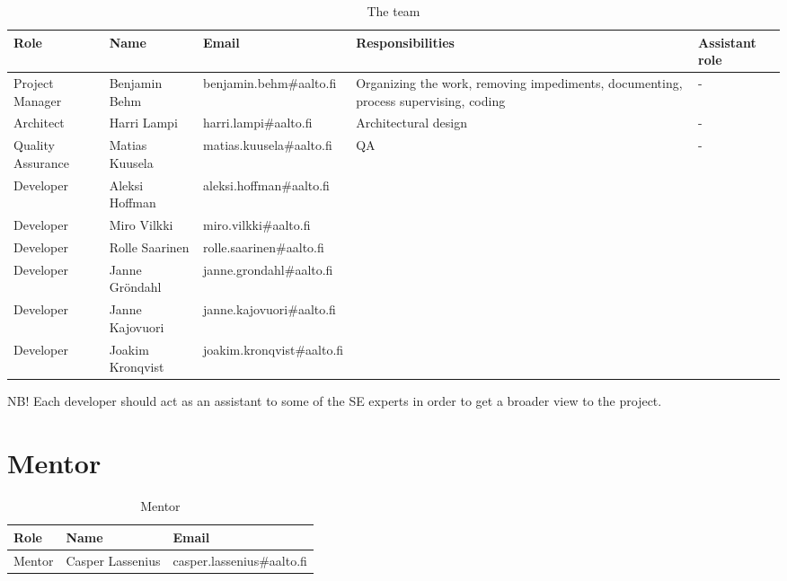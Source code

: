 \documentclass{report}
\begin{document}
\begin{table}[H]
\center
\begin{adjustwidth}{-1cm}{}
\begin{tabular}{|p{1.8cm}|p{3cm}|p{4.1cm}|p{4.1cm}|p{1.8cm}|} 
	
\hline %
\textbf{Role} & \textbf{Name} & \textbf{Email} & \textbf{Responsibilities} & \textbf{Assistant role} \\ 
\hline 
Project Manager & Benjamin Behm & benjamin.behm\#aalto.fi & Organizing the work, removing impediments, documenting, process supervising, coding & - \\ 
\hline
Architect & Harri Lampi & harri.lampi\#aalto.fi & Architectural design & - \\ 
\hline
Quality Assurance & Matias Kuusela & matias.kuusela\#aalto.fi & QA & - \\ 
\hline
Developer & Aleksi Hoffman & aleksi.hoffman\#aalto.fi & & \\
\hline
Developer & Miro Vilkki & miro.vilkki\#aalto.fi &  & \\
\hline
Developer & Rolle Saarinen & rolle.saarinen\#aalto.fi &  & \\
\hline
Developer & Janne Gr\"{o}ndahl & janne.grondahl\#aalto.fi & & \\
\hline
Developer & Janne Kajovuori & janne.kajovuori\#aalto.fi & & \\
\hline
Developer & Joakim Kronqvist & joakim.kronqvist\#aalto.fi & & \\
\hline

\end{tabular} %
\end{adjustwidth}
\caption{The team}
\label{table:Team}
\end{table}

NB! Each developer should act as an assistant to some of the SE experts in order to get a broader view to the project.


\section{Mentor}

\begin{table}[H]
\center
\begin{tabular}{|p{2cm}|p{3.8cm}|p{4.1cm}|} 

\hline 
\textbf{Role} & \textbf{Name} & \textbf{Email} \\ 
\hline
Mentor & Casper Lassenius & casper.lassenius\#aalto.fi \\
\hline
\end{tabular}
\caption{Mentor}
\label{table:Mentor}
\end{table}
\end{document}
